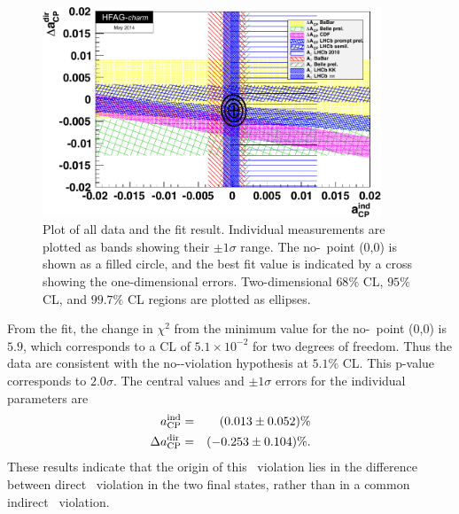 \begin{figure}
\begin{center}
\includegraphics[width=0.90\textwidth]{figures/charm/deltaACP_AGamma_fit_May14.pdf}
\caption{Plot of all data and the fit result. Individual 
measurements are plotted as bands showing their $\pm1\sigma$ range. 
The no-\cpv\ point (0,0) is shown as a filled circle, and the best 
fit value is indicated by a cross showing the one-dimensional errors. 
Two-dimensional $68\%$ CL, $95\%$ CL, and $99.7\%$ CL regions are 
plotted as ellipses. }
\label{fig:charm:dir_indir_comb}
\end{center}
\end{figure}

From the fit, the change in $\chi^2$ from the minimum value for the no-\cpv\ 
point (0,0) is $5.9$, which corresponds to a CL of $5.1\times 10^{-2}$ for 
two degrees of freedom. Thus the data are consistent with the no-\cp-violation 
hypothesis at $5.1\%$ CL. This p-value corresponds to $2.0\sigma$. The central values and $\pm1\sigma$ errors for 
the individual parameters are
\begin{eqnarray}
a_{\rm CP}^{\rm ind} & = & (0.013 \pm 0.052 )\% \nonumber\\
\Delta a_{\rm CP}^{\rm dir} & = & (-0.253 \pm 0.104 )\%.
\end{eqnarray}
These results indicate that the origin of this \cp\ violation lies in the 
difference between direct \cp\ violation in the two final states, rather 
than in a common indirect \cp\ violation.



